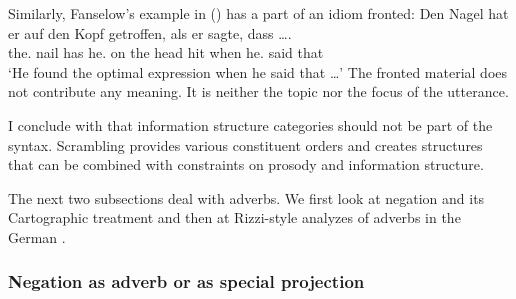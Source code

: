 Similarly, Fanselow's example in () has a part of an idiom
fronted:
\ea
\gll Den Nagel hat er auf den Kopf getroffen, als  er sagte, dass \ldots. \\
     the.\ACC{} nail  has he.\NOM{} on  the head hit        when he.\NOM{} said   that\\
\glt `He found the optimal expression when he said that \ldots'
\z
The fronted material does not contribute any meaning. It is neither the topic nor the focus of the
utterance.

I conclude with \citet{Fanselow2006a} that information structure categories should not be part of
the syntax. Scrambling provides various constituent orders and creates structures that can be combined
with constraints on prosody and information structure.

The next two subsections deal with adverbs. We first look at negation and its Cartographic treatment
and then at Rizzi-style analyzes of adverbs in the German \mf.


\subsubsection{Negation as adverb or as special projection}
\label{sec-NegP}

